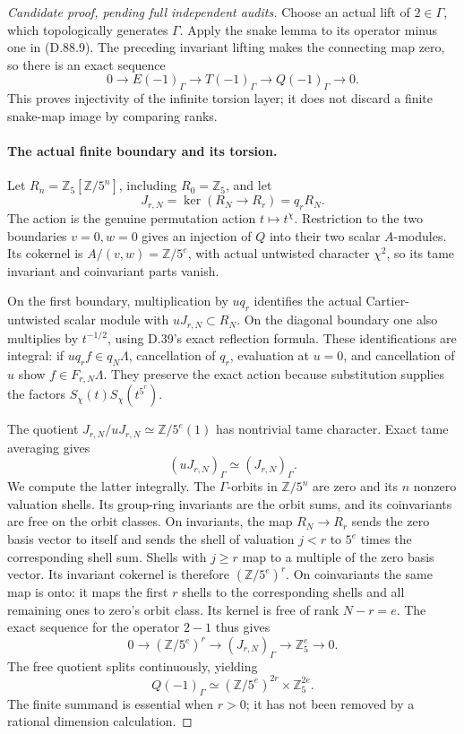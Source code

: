 \begin{proof}[Candidate proof, pending full independent audits]
Choose an actual lift of \(2\in\Gamma\), which topologically
generates \(\Gamma\). Apply the snake lemma to its operator
minus one in (D.88.9). The preceding invariant lifting makes
the connecting map zero, so there is an exact sequence
\[
 0\longrightarrow E(-1)_\Gamma\longrightarrow T(-1)_\Gamma
       \longrightarrow Q(-1)_\Gamma\longrightarrow0. \tag{D.88.13}
\]
This proves injectivity of the infinite torsion layer; it does
not discard a finite snake-map image by comparing ranks.

\paragraph{The actual finite boundary and its torsion.}
Let \(R_n=\mathbb Z_5[\mathbb Z/5^n]\), including
\(R_0=\mathbb Z_5\), and let
\[
       J_{r,N}=\ker(R_N\longrightarrow R_r)=q_rR_N.
\]
The action is the genuine permutation action
\(t\mapsto t^\chi\). Restriction to the two boundaries
\(v=0,w=0\) gives an injection of \(Q\) into their two
scalar \(A\)-modules. Its cokernel is
\(A/(v,w)=\mathbb Z/5^e\), with actual untwisted
character \(\chi^2\), so its tame invariant and coinvariant
parts vanish.

On the first boundary, multiplication by \(u q_r\)
identifies the actual Cartier-untwisted scalar module with
\(uJ_{r,N}\subset R_N\). On the diagonal boundary one
also multiplies by \(t^{-1/2}\), using D.39's exact
reflection formula. These identifications are integral:
if \(u q_r f\in q_N\Lambda\), cancellation of \(q_r\),
evaluation at \(u=0\), and cancellation of \(u\) show
\(f\in F_{r,N}\Lambda\). They preserve the exact action
because substitution supplies the factors
\(S_\chi(t)S_\chi(t^{5^r})\).

The quotient
\(J_{r,N}/uJ_{r,N}\simeq\mathbb Z/5^e(1)\)
has nontrivial tame character. Exact tame averaging gives
\[
       (uJ_{r,N})_\Gamma\simeq(J_{r,N})_\Gamma.        \tag{D.88.14}
\]
We compute the latter integrally. The \(\Gamma\)-orbits in
\(\mathbb Z/5^n\) are zero and its \(n\) nonzero valuation
shells. Its group-ring invariants are the orbit sums, and its
coinvariants are free on the orbit classes. On invariants,
the map \(R_N\to R_r\) sends the zero basis vector to
itself and sends the shell of valuation \(j<r\) to
\(5^e\) times the corresponding shell sum. Shells with
\(j\ge r\) map to a multiple of the zero basis vector.
Its invariant cokernel is therefore
\( (\mathbb Z/5^e)^r\).
On coinvariants the same map is onto: it maps the first
\(r\) shells to the corresponding shells and all remaining
ones to zero's orbit class. Its kernel is free of rank
\(N-r=e\). The exact sequence for the operator \(2-1\)
thus gives
\[
 0\longrightarrow(\mathbb Z/5^e)^r
   \longrightarrow(J_{r,N})_\Gamma
   \longrightarrow\mathbb Z_5^e\longrightarrow0.
\]
The free quotient splits continuously, yielding
\[
 Q(-1)_\Gamma\simeq
                (\mathbb Z/5^e)^{2r}\times\mathbb Z_5^{2e}.
                                                               \tag{D.88.15}
\]
The finite summand is essential when \(r>0\); it has not
been removed by a rational dimension calculation.


\end{proof}
